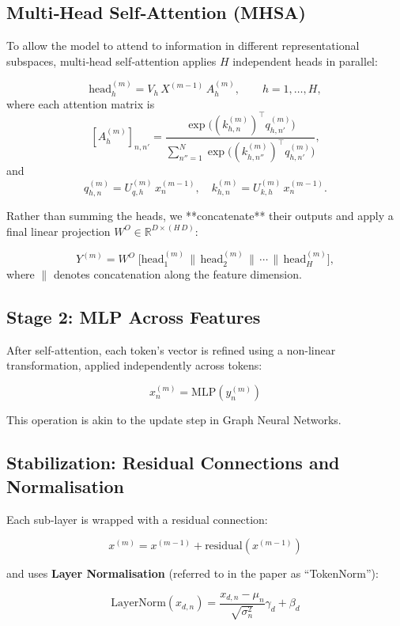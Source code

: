 \documentclass{article}
\begin{document}
\subsection{Multi‐Head Self‐Attention (MHSA)}

To allow the model to attend to information in different representational subspaces, multi‐head self‐attention applies \(H\) independent heads in parallel:

\[
\text{head}_h^{(m)}
= V_h \,X^{(m-1)}\,A_h^{(m)},
\qquad h=1,\dots,H,
\]
where each attention matrix is
\[
[A_h^{(m)}]_{n,n'}
=\frac{\exp\bigl((k_{h,n}^{(m)})^\top q_{h,n'}^{(m)}\bigr)}
      {\sum_{n''=1}^N\exp\bigl((k_{h,n''}^{(m)})^\top q_{h,n'}^{(m)}\bigr)},
\]
and
\[
q_{h,n}^{(m)}=U_{q,h}^{(m)}\,x_n^{(m-1)},
\quad
k_{h,n}^{(m)}=U_{k,h}^{(m)}\,x_n^{(m-1)}.
\]

Rather than summing the heads, we **concatenate** their outputs and apply a final linear projection \(W^O\in\mathbb{R}^{D\times (H\,D)}\):

\[
Y^{(m)}
= W^O \;\bigl[\text{head}_1^{(m)} \,\|\, \text{head}_2^{(m)} \,\|\, \cdots \,\|\, \text{head}_H^{(m)}\bigr],
\]
where \(\|\) denotes concatenation along the feature dimension.  


\subsection{Stage 2: MLP Across Features}

After self-attention, each token's vector is refined using a non-linear transformation, applied independently across tokens:

\[
x_n^{(m)} = \text{MLP}(y_n^{(m)})
\]

This operation is akin to the update step in Graph Neural Networks. \cite{turner2024introductiontransformers}

\subsection{Stabilization: Residual Connections and Normalisation}

Each sub-layer is wrapped with a residual connection:

\[
x^{(m)} = x^{(m-1)} + \text{residual}(x^{(m-1)})
\]

and uses \textbf{Layer Normalisation} (referred to in the paper as ``TokenNorm''):

\[
\text{LayerNorm}(x_{d,n}) = \frac{x_{d,n} - \mu_n}{\sqrt{\sigma_n^2}} \gamma_d + \beta_d
\]
\end{document}
